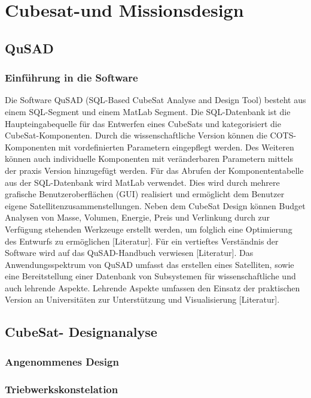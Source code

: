 \chapter{Cubesat-und Missionsdesign}
		\section{QuSAD}
			\subsection{Einführung in die Software}
Die Software QuSAD (SQL-Based CubeSat Analyse and Design Tool) besteht aus einem SQL-Segment und einem MatLab Segment. Die SQL-Datenbank ist die Haupteingabequelle für das Entwerfen eines CubeSats und kategorisiert die CubeSat-Komponenten. Durch die wissenschaftliche Version können die COTS-Komponenten mit vordefinierten Parametern eingepflegt werden. Des Weiteren können auch individuelle Komponenten mit veränderbaren Parametern mittels der praxis Version hinzugefügt werden. Für das Abrufen der Komponententabelle aus der SQL-Datenbank wird MatLab verwendet. Dies wird durch mehrere grafische Benutzeroberflächen (GUI) realisiert und ermöglicht dem Benutzer eigene Satellitenzusammenstellungen. Neben dem CubeSat Design können Budget Analysen von Masse, Volumen, Energie, Preis und Verlinkung durch zur Verfügung stehenden Werkzeuge erstellt werden, um folglich eine Optimierung des Entwurfs zu ermöglichen [Literatur]. Für ein vertieftes Verständnis der Software wird auf das QuSAD-Handbuch verwiesen [Literatur]. Das Anwendungsspektrum von QuSAD umfasst das erstellen eines Satelliten, sowie eine Bereitstellung einer Datenbank von Subsystemen für wissenschaftliche und auch lehrende Aspekte. Lehrende Aspekte umfassen den Einsatz der praktischen Version an Universitäten zur Unterstützung und Visualisierung [Literatur]. 

		\section{CubeSat- Designanalyse}
				\subsection{Angenommenes Design}
				\subsection{Triebwerkskonstelation}
